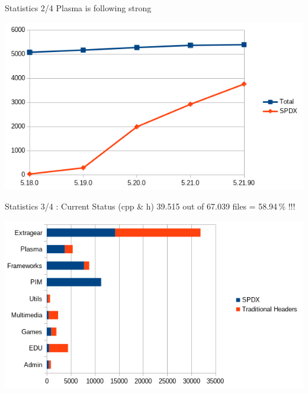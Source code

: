 \documentclass[t,compress,aspectratio=169]{beamer}
\begin{document}
\begin{frame}
    {Statistics 2/4}
    {Plasma is following strong}
    
    \begin{center}
        \includegraphics[height=.6\paperheight]{plasma}
    \end{center}
\end{frame}


\begin{frame}
    {Statistics 3/4 : Current Status (cpp \& h)}
    {39.515 out of 67.039 files = 58.94\,\% !!!}
    
    \begin{center}
        \includegraphics[height=.68\paperheight]{overall}
    \end{center}
\end{frame}
\end{document}
